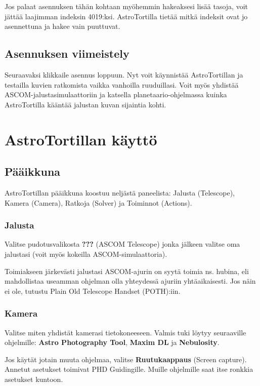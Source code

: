 \documentclass{article}
\begin{document}
Jos palaat asennuksen tähän kohtaan myöhemmin hakeaksesi lisää tasoja, voit jättää laajimman indeksin 4019:ksi. 
AstroTortilla tietää mitkä indeksit ovat jo asennettuna ja hakee vain puuttuvat.

\subsection{Asennuksen viimeistely}

Seuraavaksi klikkaile asennus loppuun. Nyt voit käynnistää AstroTortillan ja testailla kuvien ratkomista vaikka vanhoilla ruuduillasi.
Voit myös yhdistää ASCOM-jalustasimulaattoriin ja katsella planetaario-ohjelmassa kuinka AstroTortilla kääntää jalustan kuvan sijaintia kohti.

\section{AstroTortillan käyttö}

\subsection{Pääikkuna}

AstroTortillan pääikkuna koostuu neljästä paneelista: Jalusta (Telescope), Kamera (Camera), Ratkoja (Solver) ja Toiminnot (Actions).

\subsubsection{Jalusta}

Valitse pudotusvalikosta \textbf{???} (ASCOM Telescope) jonka jälkeen valitse oma jalustasi (voit myös kokeilla ASCOM-simulaattoria).

Toimiakseen järkevästi jalustasi ASCOM-ajurin on syytä toimia ns. hubina, 
eli mahdollistaa useamman ohjelman olla yhteydessä ajuriin yhtäaikaisesti.
Jos näin ei ole, tutustu Plain Old Telescope Handset (POTH):iin.

\subsubsection{Kamera}

Valitse miten yhdistät kamerasi tietokoneeseen. Valmis tuki löytyy seuraaville ohjelmille: \textbf{Astro Photography Tool}, \textbf{Maxim DL} ja \textbf{Nebulosity}.

Jos käytät jotain muuta ohjelmaa, valitse \textbf{Ruutukaappaus} (Screen capture). Annetut asetukset toimivat PHD Guidingille. 
Muille ohjelmille saat itse ronkkia asetukset kuntoon.
\end{document}
